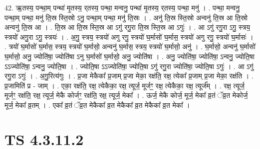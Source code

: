 \documentclass[17pt]{extarticle}
\begin{document}
42. ऋ॒तस्य॒ पन्था॒म् पन्था॑ मृ॒तस्य॒ र्‌तस्य॒ पन्था॒ मन्वनु॒ पन्था॑ मृ॒तस्य॒ र्‌तस्य॒ पन्था॒ मनु॑ । . पन्था॒ मन्वनु॒ पन्था॒म् पन्था॒ मनु॑ ति॒स्र स्ति॒स्रो ऽनु॒ पन्था॒म् पन्था॒ मनु॑ ति॒स्रः । . अनु॑ ति॒स्र स्ति॒स्रो अन्वनु॑ ति॒स्र आ ति॒स्रो अन्वनु॑ ति॒स्र आ । . ति॒स्र आ ति॒स्र स्ति॒स्र आ ऽगु॑ रगु॒रा ति॒स्र स्ति॒स्र आ ऽगुः॑ । . आ ऽगु॑ रगु॒रा ऽगु॒ स्त्रय॒ स्त्रयो॑ अगु॒रा ऽगु॒ स्त्रयः॑ । . अ॒गु॒ स्त्रय॒ स्त्रयो॑ अगु रगु॒ स्त्रयो॑ घ॒र्मासो॑ घ॒र्मास॒ स्त्रयो॑ अगु रगु॒ स्त्रयो॑ घ॒र्मासः॑ । . त्रयो॑ घ॒र्मासो॑ घ॒र्मास॒ स्त्रय॒ स्त्रयो॑ घ॒र्मासो॒ अन्वनु॑ घ॒र्मास॒ स्त्रय॒ स्त्रयो॑ घ॒र्मासो॒ अनु॑ । . घ॒र्मासो॒ अन्वनु॑ घ॒र्मासो॑ घ॒र्मासो॒ अनु॒ ज्योति॑षा॒ ज्योति॑षा ऽनु घ॒र्मासो॑ घ॒र्मासो॒ अनु॒ ज्योति॑षा । . अनु॒ ज्योति॑षा॒ ज्योति॑षा॒ ऽन्वनु॒ ज्योति॒षा ऽऽज्योति॑षा॒ ऽन्वनु॒ ज्योति॒षा । . ज्योति॒षा ऽऽज्योति॑षा॒ ज्योति॒षा ऽगु॑ रगु॒रा ज्योति॑षा॒ ज्योति॒षा ऽगुः॑ । . आ ऽगु॑ रगु॒रा ऽगुः॑ । . अ॒गु॒रित्य॑गुः । . प्र॒जा मेकैका᳚ प्र॒जाम् प्र॒जा मेका॒ रक्ष॑ति॒ रक्ष॒ त्येका᳚ प्र॒जाम् प्र॒जा मेका॒ रक्ष॑ति । . प्र॒जामिति॑ प्र - जाम् । . एका॒ रक्ष॑ति॒ रक्ष॒ त्येकैका॒ रक्ष॒ त्यूर्ज॒ मूर्जꣳ॒॒ रक्ष॒ त्येकैका॒ रक्ष॒ त्यूर्ज᳚म् । . रक्ष॒ त्यूर्ज॒ मूर्जꣳ॒॒ रक्ष॑ति॒ रक्ष॒ त्यूर्ज॒ मेकै कोर्जꣳ॒॒ रक्ष॑ति॒ रक्ष॒ त्यूर्ज॒ मेका᳚ । . ऊर्ज॒ मेकै कोर्ज॒ मूर्ज॒ मेका᳚ व्र॒तं ॅव्र॒त मेकोर्ज॒ मूर्ज॒ मेका᳚ व्र॒तम् । . एका᳚ व्र॒तं ॅव्र॒त मेकैका᳚ व्र॒त मेकैका᳚ व्र॒त मेकैका᳚ व्र॒त मेका᳚ । \newline
\pagebreak
{}

\section{ TS 4.3.11.2 }
\end{document}
